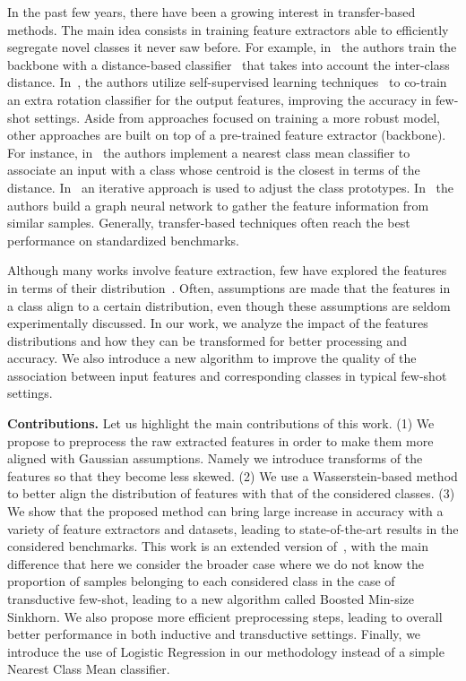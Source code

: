 \documentclass[review]{elsarticle}
\begin{document}
In the past few years, there have been a growing interest in transfer-based methods. The main idea consists in training feature extractors able to efficiently segregate novel classes it never saw before. For example, in~\cite{DBLP:conf/iclr/ChenLKWH19} the authors train the backbone with a distance-based classifier~\cite{mensink2012metric} that takes into account the inter-class distance. In~\cite{mangla2020charting}, the authors utilize self-supervised learning techniques~\cite{chapelle2009semi} to co-train an extra rotation classifier for the output features, improving the accuracy in few-shot settings. Aside from approaches focused on training a more robust model, other approaches are built on top of a pre-trained feature extractor (backbone). For instance, in~\cite{DBLP:journals/corr/abs-1911-04623} the authors implement a nearest class mean classifier to associate an input with a class whose centroid is the closest in terms of the  distance. In~\cite{lichtenstein2020tafssl} an iterative approach is used to adjust the class prototypes. In~\cite{hu2021graph} the authors build a graph neural network to gather the feature information from similar samples. Generally, transfer-based techniques often reach the best performance on standardized benchmarks.

Although many works involve feature extraction, few have explored the features in terms of their distribution~\cite{8462273, DBLP:conf/iclr/YangLX21, mangla2020charting}. Often, assumptions are made that the features in a class align to a certain distribution, even though these assumptions are seldom experimentally discussed. In our work, we analyze the impact of the features distributions and how they can be transformed for better processing and accuracy. We also introduce a new algorithm to improve the quality of the association between input features and corresponding classes in typical few-shot settings.

\textbf{Contributions.} Let us highlight the main contributions of this work. (1) We propose to preprocess the raw extracted features in order to make them more aligned with Gaussian assumptions. Namely we introduce transforms of the features so that they become less skewed. (2) We use a Wasserstein-based method to better align the distribution of features with that of the considered classes. (3) We show that the proposed method can bring large increase in accuracy with a variety of feature extractors and datasets, leading to state-of-the-art results in the considered benchmarks. This work is an extended version of~\cite{hu2021leveraging}, with the main difference that here we consider the broader case where we do not know the proportion of samples belonging to each considered class in the case of transductive few-shot, leading to a new algorithm called Boosted Min-size Sinkhorn. We also propose more efficient preprocessing steps, leading to overall better performance in both inductive and transductive settings. Finally, we introduce the use of Logistic Regression in our methodology instead of a simple Nearest Class Mean classifier.
\end{document}
